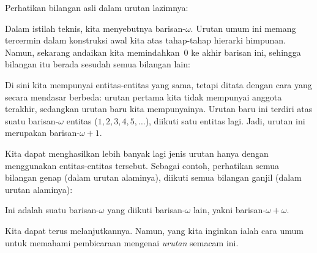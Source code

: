 \documentclass[../../../include/open-logic-section]{subfiles}
\begin{document}

Perhatikan bilangan asli dalam urutan lazimnya:
\begin{center}
\end{center}
Dalam istilah teknis, kita menyebutnya barisan-$\omega$. Urutan umum ini
memang tercermin dalam konstruksi awal kita atas tahap-tahap hierarki
himpunan. Namun, sekarang andaikan kita memindahkan~$0$ ke akhir barisan ini,
sehingga bilangan itu berada sesudah semua bilangan lain:
\begin{center}
\end{center}
Di sini kita mempunyai entitas-entitas yang sama, tetapi ditata dengan cara
yang secara mendasar berbeda: urutan pertama kita tidak mempunyai anggota
terakhir, sedangkan urutan baru kita mempunyainya. Urutan baru ini terdiri
atas suatu barisan-$\omega$ entitas ($1,2,3,4,5,\ldots$), diikuti satu entitas
lagi. Jadi, urutan ini merupakan barisan-$\omega+1$.

Kita dapat menghasilkan lebih banyak lagi jenis urutan hanya dengan
menggunakan entitas-entitas tersebut. Sebagai contoh, perhatikan semua
bilangan genap (dalam urutan alaminya), diikuti semua bilangan ganjil (dalam
urutan alaminya):
\begin{center}
\end{center}
Ini adalah suatu barisan-$\omega$ yang diikuti barisan-$\omega$ lain, yakni
barisan-$\omega+\omega$.

Kita dapat terus melanjutkannya. Namun, yang kita inginkan ialah cara umum
untuk memahami pembicaraan mengenai \emph{urutan} semacam ini.
\end{document}
